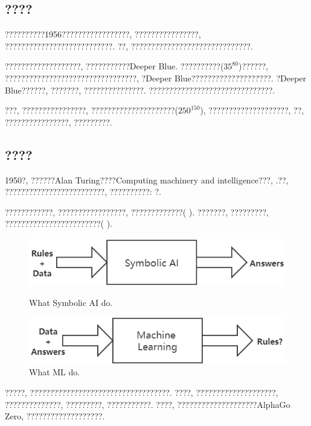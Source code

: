 \documentclass[lang=cn,11pt,a4paper]{elegantpaper}
\begin{document}
\subsection{????}
\par ??????????1956????????\cite{Dartmouth}?????????, ????????????????, ???????????????????????????. ??, ??????????????????????????????. 
\par ???????????????????, ???????????Deeper Blue. ??????????($35^{80}$\cite{artic})??????, ?????????????????????????????????, ?Deeper Blue????????????????????. ?Deeper Blue??????, ???????, ???????????????. ???????????????????????????????. 
\par ???, ????????????????, ?????????????????????($250^{150}$\cite{artic}), ????????????????????, ??, ????????????????, ?????????.
\subsection{????}
\par 1950?, ??????Alan Turing????Computing machinery and intelligence???\cite{Turing2009}, .??, ?????????????????????????, ??????????: ?. 
\par ????????????, ?????????????????, ?????????????( ). ???????, ?????????, ????????????????????????( ). 
\begin{figure}[htbp]
	\centering
	\begin{minipage}[t]{0.45\textwidth}
	\centering
	\includegraphics[width=1\textwidth]{Old}
	\caption{What Symbolic AI do.\label{fig:old}}
	\end{minipage}
	\begin{minipage}[t]{0.45\textwidth}
	\centering
	\includegraphics[width=1\textwidth]{Now}
	\caption{What ML do.\label{fig:now}}
	\end{minipage}
\end{figure}
\par ?????, ???????????????????????????????????. ????, ????????????????????, ??????????????, ?????????, ???????????. ????, ????????????????????AlphaGo Zero, ???????????????????. 
\end{document}
